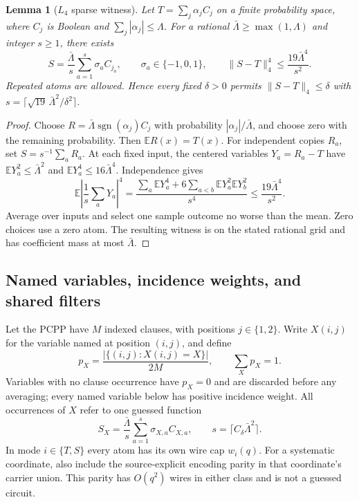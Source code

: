 \documentclass[11pt,letterpaper]{article}
\newtheorem{lemma}[theorem]{Lemma}
\theoremstyle{definition}
\theoremstyle{remark}
\begin{document}
\begin{lemma}[$L_4$ sparse witness]
\label{tr:sparse}
Let $T=\sum_j\alpha_j C_j$ on a finite probability space, where
$C_j$ is Boolean and $\sum_j|\alpha_j|\le\Lambda$. For a rational
$\bar\Lambda\ge\max(1,\Lambda)$ and integer $s\ge1$, there exists
\[
 S=\frac{\bar\Lambda}{s}\sum_{a=1}^s\sigma_a C_{j_a},
 \qquad \sigma_a\in\{-1,0,1\},
 \qquad \|S-T\|_4^4\le\frac{19\bar\Lambda^4}{s^2}.
\]
Repeated atoms are allowed. Hence every fixed $\delta>0$ permits
$\|S-T\|_4\le\delta$ with
$s=\lceil\sqrt{19}\,\bar\Lambda^2/\delta^2\rceil$.
\end{lemma}
\begin{proof}
Choose $R=\bar\Lambda\operatorname{sgn}(\alpha_j)C_j$ with
probability $|\alpha_j|/\bar\Lambda$, and choose zero with the
remaining probability. Then $\mathbb E R(x)=T(x)$.
For independent copies $R_a$, set $S=s^{-1}\sum_aR_a$.
At each fixed input, the centered variables $Y_a=R_a-T$ have
$\mathbb EY_a^2\le\bar\Lambda^2$ and
$\mathbb EY_a^4\le16\bar\Lambda^4$. Independence gives
\[
 \mathbb E\left|\frac1s\sum_aY_a\right|^4
 =\frac{\sum_a\mathbb EY_a^4+
 6\sum_{a<b}\mathbb EY_a^2\mathbb EY_b^2}{s^4}
 \le\frac{19\bar\Lambda^4}{s^2}.
\]
Average over inputs and select one sample outcome no worse than the
mean. Zero choices use a zero atom. The resulting witness is on the
stated rational grid and has coefficient mass at most $\bar\Lambda$.
\end{proof}

\subsection{Named variables, incidence weights, and shared filters}
\label{tr:masks}

Let the PCPP have $M$ indexed clauses, with positions $j\in\{1,2\}$.
Write $X(i,j)$ for the variable named at position $(i,j)$, and define
\[
 p_X=\frac{|\{(i,j):X(i,j)=X\}|}{2M},
 \qquad \sum_Xp_X=1.
\]
Variables with no clause occurrence have $p_X=0$ and are discarded
before any averaging; every named variable below has positive
incidence weight.
All occurrences of $X$ refer to one guessed function
\[
 S_X=\frac{\bar\Lambda}{s}
       \sum_{a=1}^s\sigma_{X,a}C_{X,a},
 \qquad s=\lceil C_\delta\bar\Lambda^2\rceil.
\]
In mode $i\in\{T,S\}$ every atom has its own wire cap $w_i(q)$.
For a systematic coordinate, also include the source-explicit
encoding parity in that coordinate's carrier union. This parity has
$O(q^2)$ wires in either class and is not a guessed circuit.
\end{document}
